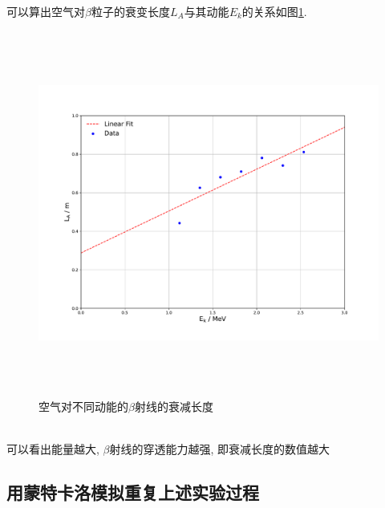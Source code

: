 \documentclass[a4paper]{article}
\begin{document}
可以算出空气对$\beta$粒子的衰变长度$L_A$与其动能$E_k$的关系如图\ref{fig:fig6}. 
\begin{figure}[ht]
 \centering
 \includegraphics[height=12cm, width=16cm]{images/phyex5_fig3.pdf}
 \caption{空气对不同动能的$\beta$射线的衰减长度}
 \label{fig:fig6}
\end{figure}\\
可以看出能量越大, $\beta$射线的穿透能力越强, 即衰减长度的数值越大
\newpage
\subsection{用蒙特卡洛模拟重复上述实验过程}\label{sub:pulsewave}
\end{document}
